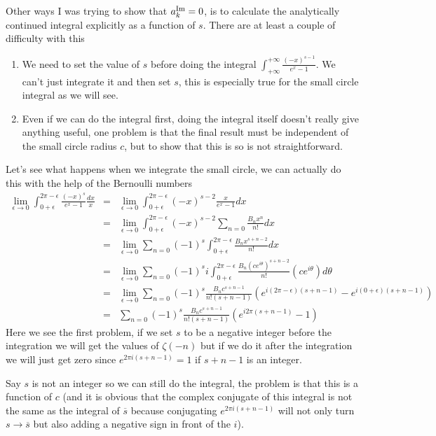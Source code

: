 \documentclass[aps,preprint,preprintnumbers,nofootinbib,showpacs,prd]{revtex4-1}
\newcommand{\nbea}{\begin{eqnarray*}}
\newcommand{\neea}{\end{eqnarray*}}
\begin{document}
Other ways I was trying to show that $a_{k}^{\rm Im} = 0$, is to calculate the analytically continued integral explicitly as a function of $s$. There are at least a couple of difficulty with this
%
\begin{enumerate}
%
\item We need to set the value of $s$ before doing the integral $\int_{+\infty}^{+\infty}\frac{(-x)^{s-1}}{e^x - 1}$. We can't just integrate it and then set $s$, this is especially true for the small circle integral as we will see.
%
\item Even if we can do the integral first, doing the integral itself doesn't really give anything useful, one problem is that the final result must be independent of the small circle radius $c$, but to show that this is so is not straightforward.
%
\end{enumerate}
%
Let's see what happens when we integrate the small circle, we can actually do this with the help of the Bernoulli numbers
%
\nbea
\lim_{\epsilon\to0} \int_{0+\epsilon}^{2\pi-\epsilon} \frac{(-x)^{s}}{e^x - 1} \frac{dx}{x} & = & \lim_{\epsilon\to0} \int_{0+\epsilon}^{2\pi-\epsilon} (-x)^{s-2}\frac{x}{e^x - 1} dx \\
& = & \lim_{\epsilon\to0} \int_{0+\epsilon}^{2\pi-\epsilon} (-x)^{s-2} \sum_{n=0} \frac{B_n x^n}{n!} dx \\
& = & \lim_{\epsilon\to0} \sum_{n=0} (-1)^{s}\int_{0+\epsilon}^{2\pi-\epsilon} \frac{B_n x^{s+n-2}}{n!} dx \\
& = & \lim_{\epsilon\to0} \sum_{n=0} (-1)^{s} i \int_{0+\epsilon}^{2\pi-\epsilon} \frac{B_n (ce^{i\theta})^{s+n-2}}{n!} (ce^{i\theta}) d\theta \\
& = & \lim_{\epsilon\to0} \sum_{n=0} (-1)^{s} \frac{B_n c^{s + n - 1}}{n! (s + n-1)} (e^{i (2\pi - \epsilon)(s+n-1)} - e^{i (0 + \epsilon)(s+n-1)}) \\
& = & \sum_{n=0} (-1)^{s} \frac{B_n c^{s + n - 1}}{n! (s + n-1)} (e^{i 2\pi (s+n-1)} - 1)
\neea
%
Here we see the first problem, if we set $s$ to be a negative integer before the integration we will get the values of $\zeta(-n)$ but if we do it after the integration we will just get zero since $e^{2\pi i(s + n - 1)} = 1$ if $s + n - 1$ is an integer.

Say $s$ is not an integer so we can still do the integral, the problem is that this is a function of $c$ (and it is obvious that the complex conjugate of this integral is not the same as the integral of $\overline{s}$ because conjugating $e^{2\pi i(s + n - 1)}$ will not only turn $s \to \overline{s}$ but also adding a negative sign in front of the $i$).
\end{document}
